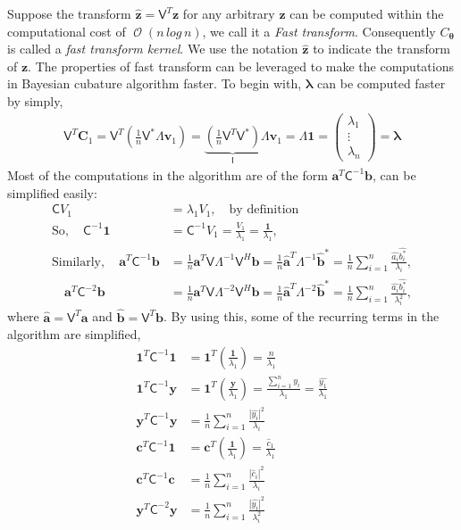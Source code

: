 \documentclass[smallextended]{svjour3}       %
\DeclareMathOperator{\Order}{{\mathcal O}}
\newcommand{\bm}[1]{\boldsymbol{#1}}
\newcommand{\vlambda}{{\bm{\lambda}}}
\newcommand{\vtheta}{{\bm{\theta}}}
\newcommand{\va}{\bm{a}}
\newcommand{\vb}{\bm{b}}
\newcommand{\vc}{\bm{c}}
\newcommand{\vC}{\bm{C}}
\newcommand{\vv}{\bm{v}}
\newcommand{\vy}{\bm{y}}
\newcommand{\vz}{\bm{z}}
\newcommand{\vone}{\bm{1}}
\newcommand{\mC}{\mathsf{C}}
\newcommand{\mCInv}{{\mathsf{C}^{-1}}}
\newcommand{\mLambda}{\mathsf{\Lambda}}
\newcommand{\mLambdaInv}{\mathsf{\Lambda}^{-1}}
\newcommand{\mV}{\mathsf{V}}
\def\abs#1{\ensuremath{\left \lvert #1 \right \rvert}}
\begin{document}
Suppose the transform $\hat{\vz} = \mV^T \vz$ for any arbitrary $\vz$ can be computed within the computational cost of $\Order( n \, log\, n)$, we call it a \emph{Fast transform}. Consequently $C_{\vtheta}$ is called a \emph{fast transform kernel}.
We use the notation $\hat{\vz}$ to indicate the transform of $\vz$.
The properties of fast transform can be leveraged to make the computations in Bayesian cubature algorithm faster. To begin with, $\vlambda$ can be computed faster by simply,
\begin{align}
\label{eqn:fast_trasnform_to_eigvalues}
\mV^T \vC_1 = \mV^T \left( \frac 1n \mV^* \mLambda \vv_1 \right) =
\underbrace{\left( \frac 1n \mV^T  \mV^* \right) }_{\mathsf{I}} \mLambda \vv_1  =  \mLambda \vone =
\begin{pmatrix}
\lambda_1 \\ \vdots \\ \lambda_n
\end{pmatrix} = \vlambda
\end{align}
Most of the computations in the algorithm are of the form $\va^T\mCInv\vb$, can be simplified easily:
\begin{align*}
\mC V_1 &= \lambda_1 V_1 , \quad \text{by definition}
\\
\text{So}, \quad
\mCInv \vone &= \mCInv V_1 = \frac{V_1}{\lambda_1} = \frac{\vone}{\lambda_1} , 
\\
\text{Similarly}, \quad \va^T\mCInv\vb &= \frac 1n \va^T \mV \mLambdaInv \mV^H \vb
= \frac 1n \widehat{\va}^T\mLambdaInv \widehat{\vb}^*
= \frac 1n \sum_{i=1}^n \frac{\widehat{a_i} \widehat{b_i^*}}{\lambda_i},
\\
\quad \va^T\mC^{-2}\vb &= \frac 1n \va^T \mV \mLambda^{-2} \mV^H \vb
= \frac 1n \widehat{\va}^T\mLambda^{-2} \widehat{\vb}^*
= \frac 1n \sum_{i=1}^n \frac{\widehat{a_i} \widehat{b_i^*}}{\lambda_i^2},
\end{align*}
where $\widehat{\va} = \mV^T \va$ and $\widehat{\vb} = \mV^T \vb$. By using this, some of the recurring terms in the algorithm are simplified,
\begin{align*}
\vone^T\mCInv\vone &= \vone^T \left(\frac{\vone}{\lambda_1}\right) = \frac{n}{\lambda_1}
\\
\vone^T\mCInv\vy &= \vone^T \left( \frac{\vy}{\lambda_1} \right) = \frac{\sum_{i=1}^n y_i}{\lambda_1} = \frac{\widehat{y_1}}{\lambda_1}
\\
\vy^T\mCInv \vy &= \frac 1n \sum_{i=1}^n \frac{\abs{\widehat{y_i}}^2}{\lambda_i}
\\
\vc^T\mCInv \vone &= \vc^T \left(\frac{ \vone }{\lambda_1} \right) = \frac{\widehat{c}_1}{\lambda_1}
\\
\vc^T\mCInv \vc &= \frac 1n \sum_{i=1}^n \frac{\abs{\widehat{c}_i}^2}{\lambda_i}
\\
\vy^T\mC^{-2} \vy &= \frac 1n \sum_{i=1}^n \frac{\abs{\widehat{y_i}}^2}{\lambda_i^2}
\end{align*}
\end{document}
